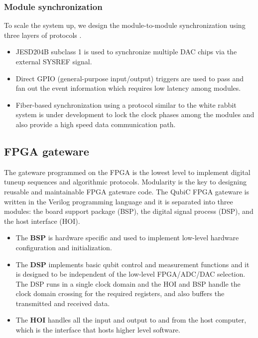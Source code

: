 \documentclass{ieeetran}
\begin{document}
\subsubsection{Module synchronization}
To scale the system up, we design the module-to-module synchronization using three layers of protocols \cite{huang2021clock}. 
\begin{itemize}
\item JESD204B subclass 1 \cite{ti2016jesd204b} is used to synchronize multiple DAC chips via the external SYSREF signal. 
\item Direct GPIO (general-purpose input/output) triggers are used to pass and fan out the event information which requires low latency among modules. 
\item Fiber-based synchronization using a protocol similar to the white rabbit \cite{moreira2009white} system is under development to lock the clock phases among the modules and also provide a high speed data communication path. 
\end{itemize}

\subsection{FPGA gateware}
The gateware programmed on the FPGA is the lowest level to implement digital tuneup sequences and algorithmic protocols. 
Modularity is the key to designing reusable and maintainable FPGA gateware code.
The QubiC FPGA gateware is written in the Verilog programming language and it is separated into three modules: the board support package (BSP), the digital signal process (DSP), and the host interface (HOI). 
\begin{itemize}
\item The \textbf{BSP} is hardware specific and used to implement low-level hardware configuration and initialization. 
\item The \textbf{DSP} implements basic qubit control and measurement functions and it is designed to be independent of the low-level FPGA/ADC/DAC selection. 
The DSP runs in a single clock domain and the HOI and BSP handle the clock domain crossing for the required registers, and also buffers the transmitted and received data.
\item The \textbf{HOI} handles all the input and output to and from the host computer, which is the interface that hosts higher level software.
\end{itemize}
\end{document}
